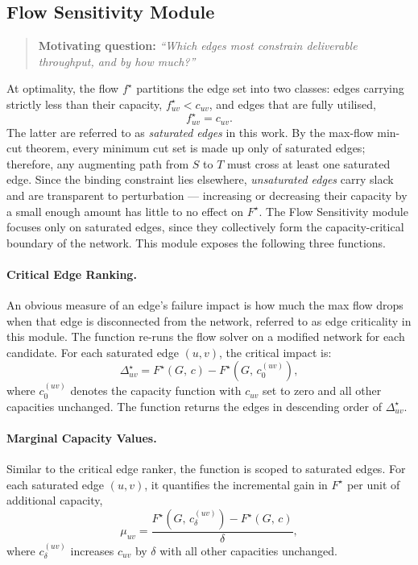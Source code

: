 \documentclass[12pt]{report}
\begin{document}
\subsection{Flow Sensitivity Module}
\begin{quote}
    \textbf{Motivating question:} 
    \textit{``Which edges most constrain deliverable throughput, 
    and by how much?''}
\end{quote}
At optimality, the flow $f^\star$ partitions the edge set into two 
classes: edges carrying strictly less than their capacity, $f^\star_{uv} < c_{uv}$, and edges that are fully utilised,
\[
f^\star_{uv} = c_{uv}.
\]
The latter are referred to as \emph{saturated edges} in this work. By the max-flow min-cut theorem, every minimum cut set is made up only of saturated edges; therefore, any augmenting path from $S$ to $T$ must cross at least one saturated edge. Since the binding constraint lies elsewhere, \emph{unsaturated edges} carry slack and are transparent to perturbation — increasing or decreasing their capacity by a small enough amount has little to no effect on $F^\star$. The Flow Sensitivity module focuses only on saturated edges, since they collectively form the capacity-critical boundary of the network. This module exposes the following three functions.

\paragraph{Critical Edge Ranking.}
An obvious measure of an edge's failure impact is how much the max flow drops when that edge is disconnected from the network, referred to as edge criticality in this module. The function re-runs the flow solver on a modified network for each candidate. For each saturated edge $(u,v)$, the critical impact is:
\[
\Delta^\star_{uv} = F^\star(G,\, c) - 
F^\star\!\left(G,\, c^{(uv)}_0\right),
\]
where $c^{(uv)}_0$ denotes the capacity function with $c_{uv}$ set to zero and all other capacities unchanged. The function returns the edges in descending order of $\Delta^\star_{uv}$. 


\paragraph{Marginal Capacity Values.}
 Similar to the critical edge ranker, the function is scoped to saturated edges. For each saturated edge $(u,v)$, it quantifies the incremental gain in $F^\star$ per unit of additional capacity,
\[
\mu_{uv} = \frac{F^\star(G,\, c^{(uv)}_\delta) - 
F^\star(G,\, c)}{\delta},
\]
where $c^{(uv)}_\delta$ increases $c_{uv}$ by $\delta$ with all other capacities unchanged. 
\end{document}
